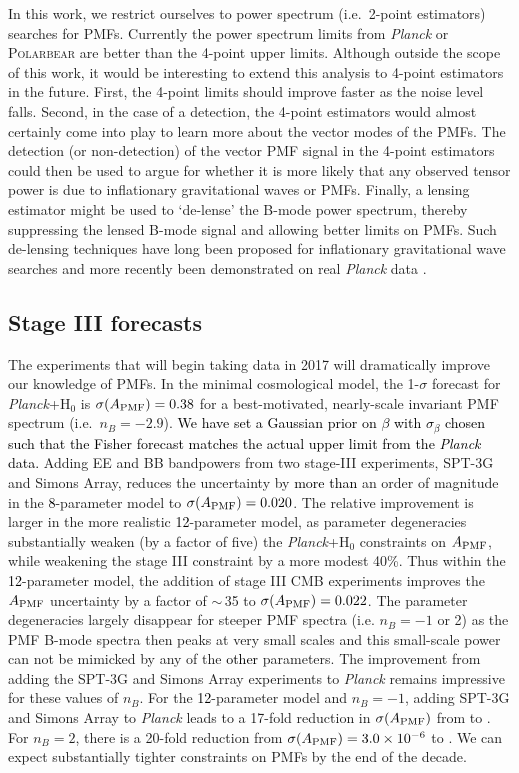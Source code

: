 \documentclass[apj]{emulateapj}
\newcommand{\apmf}{\ensuremath{A_{\rm PMF}}}
\newcommand{\ho}{H\ensuremath{_0}}
\newcommand{\planck}{{\sl Planck}}
\newcommand{\sptnew}{SPT-3G}
\newcommand{\pb}{\textsc{Polarbear}}
\newcommand{\simons}{Simons Array}
\newcommand{\changed}[1]{\textcolor{Black}{#1}}
\begin{document}
In this work, we restrict ourselves to power spectrum (i.e.~2-point estimators) searches for PMFs. 
Currently the power spectrum limits from \planck{} or \pb{} are better than the 4-point upper limits. 
Although outside the scope of this work, it would be interesting to extend this analysis to 4-point estimators in the future. 
First, the 4-point limits should improve faster as the noise level falls. 
Second, in the case of a detection, the 4-point estimators would almost certainly come into play to learn more about the vector modes of the PMFs. 
The detection (or non-detection) of the vector PMF signal in the 4-point estimators could then be used to argue for whether it is more likely that any observed tensor power is due to  inflationary gravitational waves or  PMFs. 
Finally, a lensing estimator might be used to `de-lense' the B-mode power spectrum, thereby suppressing the lensed B-mode signal and allowing better limits on PMFs. 
Such de-lensing techniques have long been proposed for inflationary gravitational wave searches \citep[e.g.][]{knox02,kesden02,seljak04a,simard15} and more recently been demonstrated on real \planck{} data \citep{larsen16}. 


\subsection{Stage III forecasts}

The experiments that will begin taking data in 2017 will dramatically improve our knowledge of PMFs. 
In the minimal cosmological model, the 1-$\sigma$ forecast for \planck{}+\ho{} is $\sigma(\apmf)=\fisherAplk$ for a best-motivated, nearly-scale invariant PMF spectrum (i.e.~$n_B=-2.9$). 
\changed{We have set a Gaussian prior on $\beta$ with $\sigma_\beta$ chosen such that the Fisher forecast matches the actual upper limit from the \planck{} data.  }
Adding  EE and BB bandpowers from two stage-III experiments, \sptnew{} and \simons{}, reduces the uncertainty by \changed{more than} an order of magnitude in the \changed{8}-parameter model to $\sigma(\apmf)=\fisherASThree$. 
The relative improvement is larger in the more realistic \changed{12}-parameter model, as parameter degeneracies substantially weaken (by a factor of five) the \planck+\ho{} constraints on \apmf{}, while weakening the stage III constraint by a  more modest 40\%. 
Thus within the \changed{12}-parameter model,  the addition of stage III CMB experiments improves the \apmf{} uncertainty by a factor of $\sim$\,35 to  $\sigma(\apmf)=\fisherAlooseSThree$. 
The parameter degeneracies largely disappear for steeper PMF spectra (i.e. $n_B=-1$ or 2) as the PMF B-mode spectra then peaks at very small scales and this small-scale power can not be mimicked by any of the \changed{other} parameters. 
The improvement from adding the SPT-3G and Simons Array experiments to \planck{} remains impressive for these values of $n_B$.
For the \changed{12}-parameter model and $n_B=-1$, adding SPT-3G and Simons Array to \planck{} leads to a 17-fold reduction in $\sigma(\apmf)$ from \fisherAlooseNbOneplk{} to \fisherAlooseNbOneSThree{}.
For $n_B=2$, there is a 20-fold reduction from $\sigma(\apmf) = \fisherAlooseNbTwoplk$ to  \fisherAlooseNbTwoSThree. 
We can expect substantially tighter constraints on PMFs by the end of the decade. 
\end{document}
